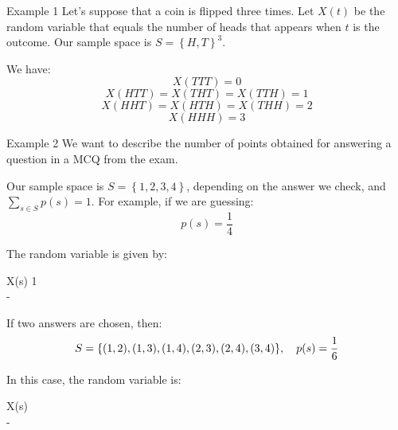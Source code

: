 \documentclass[a4paper]{article}
\begin{document}
\begin{parag}{Example 1}
    Let's suppose that a coin is flipped three times. Let $X\left(t\right)$ be the random variable that equals the number of heads that appears when $t$ is the outcome. Our sample space is $S = \left\{H, T\right\}^3$.

    We have: 
    \[X\left(TTT\right) = 0\]
    \[X\left(HTT\right) = X\left(THT\right) = X\left(TTH\right) = 1\]
    \[X\left(HHT\right) = X\left(HTH\right) = X\left(THH\right) = 2\]
    \[X\left(HHH\right) = 3\]
\end{parag}

\begin{parag}{Example 2}
    We want to describe the number of points obtained for answering a question in a MCQ from the exam. 

    Our sample space is $S = \left\{1, 2, 3, 4\right\}$, depending on the answer we check, and $\sum_{s \in S}^{} p\left(s\right) = 1$. For example, if we are guessing: 
    \[p\left(s\right) = \frac{1}{4}\]
    
    The random variable is given by:
    \begin{functionbypart}{X\left(s\right)}
    1   \\
    - 
    \end{functionbypart}

    If two answers are chosen, then: 
    \[S = \left\{\left(1, 2\right), \left(1, 3\right), \left(1, 4\right), \left(2, 3\right), \left(2, 4\right), \left(3, 4\right)\right\}, \mathspace p\left(s\right) = \frac{1}{6}\]

    In this case, the random variable is:
    \begin{functionbypart}{X\left(s\right)}
       \\
    - 
    \end{functionbypart}
\end{parag}
\end{document}
